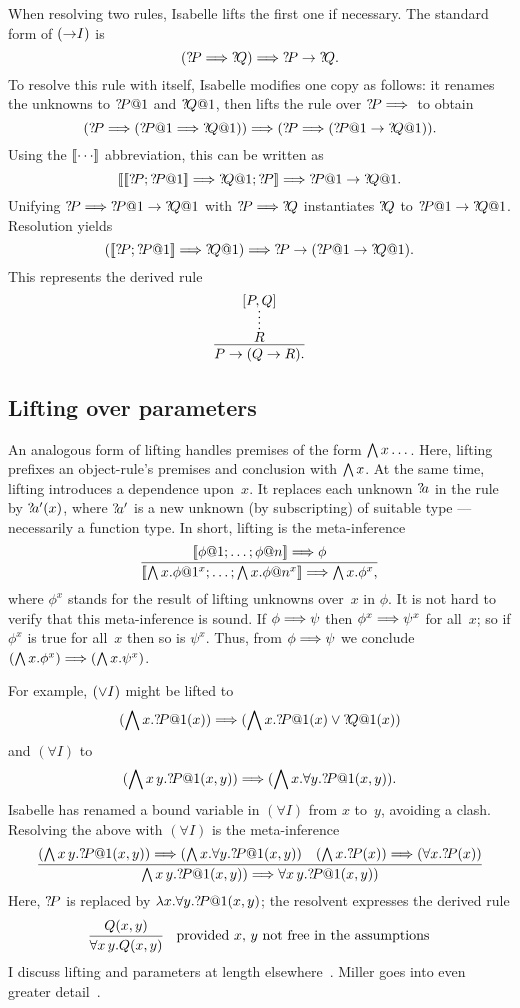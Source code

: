 When resolving two rules, Isabelle lifts the first one if necessary. The
standard form of $({\rightarrow}I)$ is
\[ ({?\!P} \Longrightarrow {?\!Q})  \Longrightarrow  {?\!P}\rightarrow {?\!Q}.   \]
To resolve this rule with itself, Isabelle modifies one copy as follows: it
renames the unknowns to ${?\!P@1}$ and ${?\!Q@1}$, then lifts the rule over
${?\!P}\Longrightarrow{}$ to obtain
\[ ({?\!P}\Longrightarrow ({?\!P@1} \Longrightarrow {?\!Q@1})) \Longrightarrow ({?\!P} \Longrightarrow
({?\!P@1}\rightarrow {?\!Q@1})).   \]
Using the $\mathopen{[\![}\cdots\mathclose{]\!]}$ abbreviation, this can be written as
\[ \List{\List{\Var{P}; \Var{P@1}} \Imp \Var{Q@1}; \Var{P}}
\Imp  \Var{P@1}\imp \Var{Q@1}.   \]
Unifying ${?\!P}\Longrightarrow {?\!P@1}\rightarrow{?\!Q@1}$ with ${?\!P} \Longrightarrow
{?\!Q}$ instantiates ${?\!Q}$ to ${{?\!P@1}\rightarrow{?\!Q@1}}$.
Resolution yields
\[ (\List{\Var{P}; \Var{P@1}} \Imp \Var{Q@1}) \Imp
\Var{P}\imp(\Var{P@1}\imp\Var{Q@1}).   \]
This represents the derived rule
\[ \infer{P\imp(Q\imp R).}{\infer*{R}{[P,Q]}} \]

\subsection{Lifting over parameters}
An analogous form of lifting handles premises of the form $\bigwedge x\ldots\,$.
Here, lifting prefixes an object-rule's premises and conclusion with $\bigwedge
x$. At the same time, lifting introduces a dependence upon~$x$. It replaces
each unknown ${?\!a}$ in the rule by ${?\!a'}(x)$, where ${?\!a'}$ is a new
unknown (by subscripting) of suitable type --- necessarily a function type. In
short, lifting is the meta-inference
\[ \infer{\List{\Forall x.\phi@1^x; \ldots; \Forall x.\phi@n^x}
\Imp \Forall x.\phi^x,}
{\List{\phi@1; \ldots; \phi@n} \Imp \phi} \]
%
where $\phi^x$ stands for the result of lifting unknowns over~$x$ in
$\phi$. It is not hard to verify that this meta-inference is sound. If
$\phi\Longrightarrow\psi$ then $\phi^x\Longrightarrow\psi^x$ for all~$x$; so if $\phi^x$ is true
for all~$x$ then so is $\psi^x$. Thus, from $\phi\Longrightarrow\psi$ we conclude
$(\bigwedge x.\phi^x) \Longrightarrow (\bigwedge x.\psi^x)$.

For example, $(\vee I)$ might be lifted to
\[ (\bigwedge x.{?\!P@1}(x)) \Longrightarrow (\bigwedge x. {?\!P@1}(x)\vee {?\!Q@1}(x))\]
and $(\forall I)$ to
\[ (\bigwedge x\,y.{?\!P@1}(x,y)) \Longrightarrow (\bigwedge x. \forall y.{?\!P@1}(x,y)). \]
Isabelle has renamed a bound variable in $(\forall I)$ from $x$ to~$y$,
avoiding a clash. Resolving the above with $(\forall I)$ is the meta-inference
\[ \infer{\Forall x\,y.\Var{P@1}(x,y)) \Imp \forall x\,y.\Var{P@1}(x,y)) }
{(\Forall x\,y.\Var{P@1}(x,y)) \Imp
(\Forall x. \forall y.\Var{P@1}(x,y))  &
    (\Forall x.\Var{P}(x)) \Imp (\forall x.\Var{P}(x))} \]
Here, ${?\!P}$ is replaced by $\lambda x.\forall y.{?\!P@1}(x,y)$; the
resolvent expresses the derived rule
\[ \vcenter{ \infer{\forall x\,y.Q(x,y)}{Q(x,y)} }
\quad\hbox{provided $x$, $y$ not free in the assumptions}
\]
I discuss lifting and parameters at length elsewhere~\cite{paulson-found}.
Miller goes into even greater detail~\cite{miller-mixed}.


